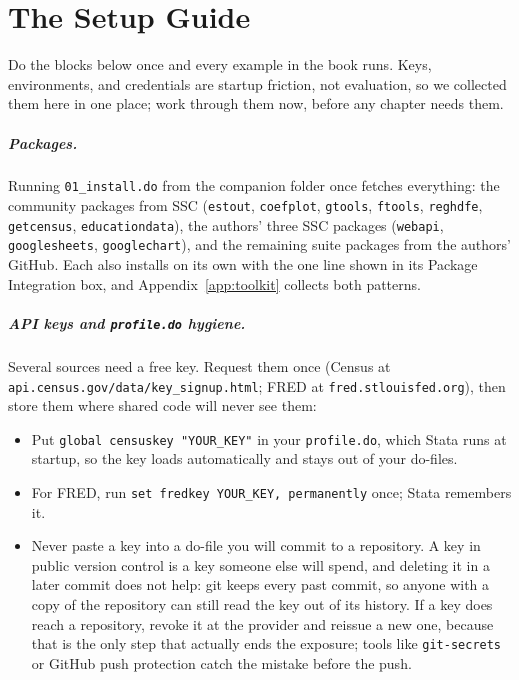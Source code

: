 \documentclass[
    a4paper,
    fontsize=10pt,
    twoside=true,
    numbers=noenddot,
]{kaobook}
\begin{document}

\appendix
{}

\chapter{The Setup Guide}\label{app:setup}
Do the blocks below once and every example in the book runs. Keys, environments, and credentials are startup friction, not evaluation, so we collected them here in one place; work through them now, before any chapter needs them.

\paragraph{Packages.} Running \texttt{01\_install.do} from the companion folder once fetches everything: the community packages from SSC (\texttt{estout}, \texttt{coefplot}, \texttt{gtools}, \texttt{ftools}, \texttt{reghdfe}, \texttt{getcensus}, \texttt{educationdata}), the authors' three SSC packages (\texttt{webapi}, \texttt{googlesheets}, \texttt{googlechart}), and the remaining suite packages from the authors' GitHub. Each also installs on its own with the one line shown in its Package Integration box, and Appendix~\ref{app:toolkit} collects both patterns.

\paragraph{API keys and \texttt{profile.do} hygiene.} Several sources need a free key. Request them once (Census at \texttt{api.census.gov/data/key\_signup.html}; FRED at \texttt{fred.stlouisfed.org}), then store them where shared code will never see them:
\begin{itemize}
    \item Put \texttt{global censuskey "YOUR\_KEY"} in your \texttt{profile.do}, which Stata runs at startup, so the key loads automatically and stays out of your do-files.
    \item For FRED, run \texttt{set fredkey YOUR\_KEY, permanently} once; Stata remembers it.
    \item Never paste a key into a do-file you will commit to a repository. A key in public version control is a key someone else will spend, and deleting it in a later commit does not help: git keeps every past commit, so anyone with a copy of the repository can still read the key out of its history. If a key does reach a repository, revoke it at the provider and reissue a new one, because that is the only step that actually ends the exposure; tools like \texttt{git-secrets} or GitHub push protection catch the mistake before the push.
\end{itemize}
\end{document}
